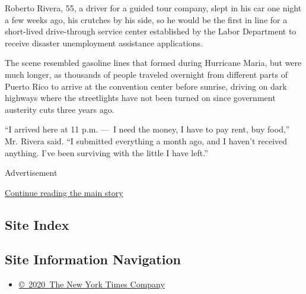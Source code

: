 Roberto Rivera, 55, a driver for a guided tour company, slept in his car
one night a few weeks ago, his crutches by his side, so he would be the
first in line for a short-lived drive-through service center established
by the Labor Department to receive disaster unemployment assistance
applications.

The scene resembled gasoline lines that formed during Hurricane Maria,
but were much longer, as thousands of people traveled overnight from
different parts of Puerto Rico to arrive at the convention center before
sunrise, driving on dark highways where the streetlights have not been
turned on since government austerity cuts three years ago.

``I arrived here at 11 p.m. ---~I need the money, I have to pay rent,
buy food,'' Mr. Rivera said. ``I submitted everything a month ago, and I
haven't received anything. I've been surviving with the little I have
left.''

Advertisement

\protect\hyperlink{after-bottom}{Continue reading the main story}

\hypertarget{site-index}{%
\subsection{Site Index}\label{site-index}}

\hypertarget{site-information-navigation}{%
\subsection{Site Information
Navigation}\label{site-information-navigation}}

\begin{itemize}
\tightlist
\item
  \href{https://help.nytimes3xbfgragh.onion/hc/en-us/articles/115014792127-Copyright-notice}{©~2020~The
  New York Times Company}
\end{itemize}

